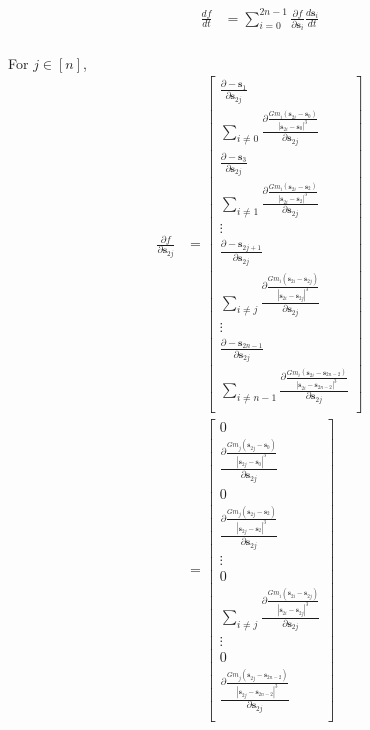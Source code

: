 \documentclass[12pt,letterpaper]{article}
\newcommand{\ves}{\bm{s}}
\begin{document}
    \begin{align*}
        \frac{df}{dt}
        &=\sum_{i=0}^{2n-1}\frac{\partial f}{\partial \ves_i}\frac{d\ves_i}{dt}\\
    \end{align*}

    For $j\in[n]$,
    \begin{align*}
        \frac{\partial f}{\partial \ves_{2j}}
        &=\left[\begin{matrix}
            \frac{\partial -\ves_1}{\partial \ves_{2j}}\\
            \sum_{i\neq 0}\frac{\partial\frac{Gm_i(\ves_{2i}-\ves_0)}{|\ves_{2i}-\ves_0|^3}}{\partial \ves_{2j}}\\
            \frac{\partial -\ves_3}{\partial \ves_{2j}}\\
            \sum_{i\neq 1}\frac{\partial\frac{Gm_i(\ves_{2i}-\ves_2)}{|\ves_{2i}-\ves_2|^3}}{\partial \ves_{2j}}\\
            \vdots\\
            \frac{\partial -\ves_{2j+1}}{\partial \ves_{2j}}\\
            \sum_{i\neq j}\frac{\partial\frac{Gm_i(\ves_{2i}-\ves_{2j})}{|\ves_{2i}-\ves_{2j}|^3}}{\partial \ves_{2j}}\\
            \vdots\\
            \frac{\partial -\ves_{2n-1}}{\partial \ves_{2j}}\\
            \sum_{i\neq {n-1}}\frac{\partial\frac{Gm_i(\ves_{2i}-\ves_{2n-2})}{|\ves_{2i}-\ves_{2n-2}|^3}}{\partial \ves_{2j}}\\
        \end{matrix}\right]\\
        &=\left[\begin{matrix}
            0\\
            \frac{\partial\frac{Gm_j(\ves_{2j}-\ves_0)}{|\ves_{2j}-\ves_0|^3}}{\partial \ves_{2j}}\\
            0\\
            \frac{\partial\frac{Gm_j(\ves_{2j}-\ves_2)}{|\ves_{2j}-\ves_2|^3}}{\partial \ves_{2j}}\\
            \vdots\\
            0\\
            \sum_{i\neq j}\frac{\partial\frac{Gm_i(\ves_{2i}-\ves_{2j})}{|\ves_{2i}-\ves_{2j}|^3}}{\partial \ves_{2j}}\\
            \vdots\\
            0\\
            \frac{\partial\frac{Gm_j(\ves_{2j}-\ves_{2n-2})}{|\ves_{2j}-\ves_{2n-2}|^3}}{\partial \ves_{2j}}\\
        \end{matrix}\right]\\
    \end{align*}
\end{document}
